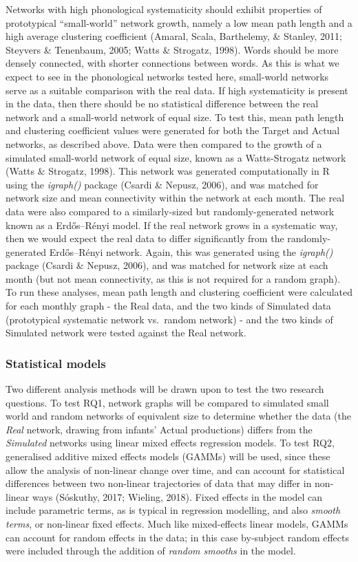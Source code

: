 \documentclass[
  man]{apa6}
\begin{document}
Networks with high phonological systematicity should exhibit properties of prototypical ``small-world'' network growth, namely a low mean path length and a high average clustering coefficient (Amaral, Scala, Barthelemy, \& Stanley, 2011; Steyvers \& Tenenbaum, 2005; Watts \& Strogatz, 1998). Words should be more densely connected, with shorter connections between words. As this is what we expect to see in the phonological networks tested here, small-world networks serve as a suitable comparison with the real data. If high systematicity is present in the data, then there should be no statistical difference between the real network and a small-world network of equal size. To test this, mean path length and clustering coefficient values were generated for both the Target and Actual networks, as described above. Data were then compared to the growth of a simulated small-world network of equal size, known as a Watts-Strogatz network (Watts \& Strogatz, 1998). This network was generated computationally in R using the \emph{igraph()} package (Csardi \& Nepusz, 2006), and was matched for network size and mean connectivity within the network at each month. The real data were also compared to a similarly-sized but randomly-generated network known as a Erdős--Rényi model. If the real network grows in a systematic way, then we would expect the real data to differ significantly from the randomly-generated Erdős--Rényi network. Again, this was generated using the \emph{igraph()} package (Csardi \& Nepusz, 2006), and was matched for network size at each month (but not mean connectivity, as this is not required for a random graph). To run these analyses, mean path length and clustering coefficient were calculated for each monthly graph - the Real data, and the two kinds of Simulated data (prototypical systematic network vs.~random network) - and the two kinds of Simulated network were tested against the Real network.

\subsubsection{Statistical models}\label{statistical-models}

Two different analysis methods will be drawn upon to test the two research questions. To test RQ1, network graphs will be compared to simulated small world and random networks of equivalent size to determine whether the data (the \emph{Real} network, drawing from infants' Actual productions) differs from the \emph{Simulated} networks using linear mixed effects regression models. To test RQ2, generalised additive mixed effects models (GAMMs) will be used, since these allow the analysis of non-linear change over time, and can account for statistical differences between two non-linear trajectories of data that may differ in non-linear ways (Sóskuthy, 2017; Wieling, 2018). Fixed effects in the model can include parametric terms, as is typical in regression modelling, and also \emph{smooth terms}, or non-linear fixed effects. Much like mixed-effects linear models, GAMMs can account for random effects in the data; in this case by-subject random effects were included through the addition of \emph{random smooths} in the model.
\end{document}
